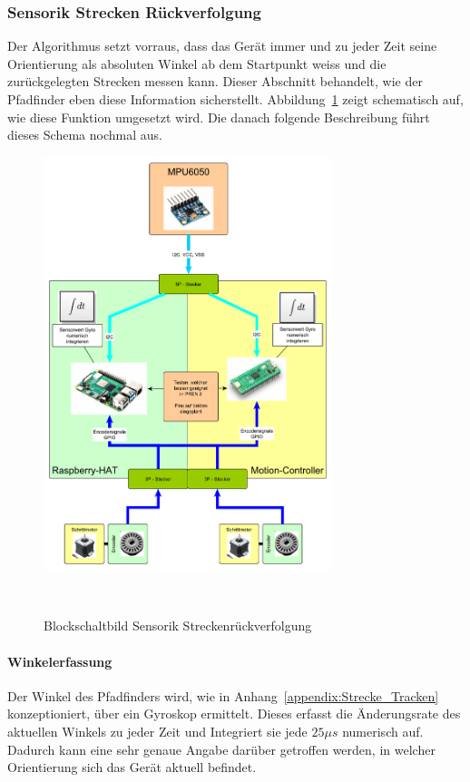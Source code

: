 \documentclass[main.tex]{subfiles} %
\begin{document}

\subsubsection{Sensorik Strecken Rückverfolgung}

Der Algorithmus setzt vorraus, dass das Gerät immer und zu jeder Zeit seine
Orientierung als absoluten Winkel ab dem Startpunkt weiss und die
zurückgelegten Strecken messen kann. Dieser Abschnitt behandelt, wie der
Pfadfinder eben diese Information sicherstellt.
Abbildung~\ref{fig:Blockschaltbild_StreckenTracken} zeigt schematisch auf, wie
diese Funktion umgesetzt wird. Die danach folgende Beschreibung führt dieses
Schema nochmal aus.

\begin{figure}[h!]
    \centering
    \includegraphics[width=0.75\textwidth]{./fig_Strecke_Tracken/Topologie_MPU6050.pdf}
    \caption{Blockschaltbild Sensorik Streckenrückverfolgung}~\label{fig:Blockschaltbild_StreckenTracken}
\end{figure}

\paragraph{Winkelerfassung}
Der Winkel des Pfadfinders wird, wie in Anhang~\ref{appendix:Strecke_Tracken}
konzeptioniert, über ein Gyroskop ermittelt. Dieses erfasst die Änderungsrate
des aktuellen Winkels zu jeder Zeit und Integriert sie jede $25\mu s$ numerisch
auf. Dadurch kann eine sehr genaue Angabe darüber getroffen werden, in welcher
Orientierung sich das Gerät aktuell befindet.
\end{document}
